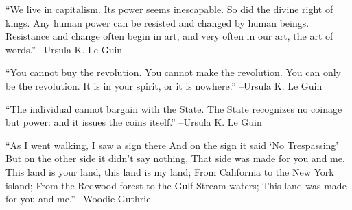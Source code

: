 \documentclass{article}%
\begin{document}
\vspace{1mm}%
\begin{minipage}{\textwidth}%
\flushleft%
“We live in capitalism. Its power seems inescapable. So did the divine right of kings. Any human power can be resisted and changed by human beings. Resistance and change often begin in art, and very often in our art, the art of words.”%
\linebreak%
\vspace{1mm}%
–Ursula K. Le Guin%
\linebreak%
\vspace{1mm}%
\end{minipage}%
\linebreak%
\vspace{1mm}%
\begin{minipage}{\textwidth}%
\flushleft%
“You cannot buy the revolution. You cannot make the revolution. You can only be the revolution. It is in your spirit, or it is nowhere.”%
\linebreak%
\vspace{1mm}%
–Ursula K. Le Guin%
\linebreak%
\vspace{1mm}%
\end{minipage}%
\linebreak%
\vspace{1mm}%
\begin{minipage}{\textwidth}%
\flushleft%
“The individual cannot bargain with the State. The State recognizes no coinage but power: and it issues the coins itself.”%
\linebreak%
\vspace{1mm}%
–Ursula K. Le Guin%
\linebreak%
\vspace{1mm}%
\end{minipage}%
\linebreak%
\vspace{1mm}%
\begin{minipage}{\textwidth}%
\flushleft%
“As I went walking, I saw a sign there And on the sign it said ‘No Trespassing’ But on the other side it didn't say nothing, That side was made for you and me. This land is your land, this land is my land; From California to the New York island; From the Redwood forest to the Gulf Stream waters; This land was made for you and me.”%
\linebreak%
\vspace{1mm}%
–Woodie Guthrie%
\linebreak%
\vspace{1mm}%
\end{minipage}%
\end{document}
